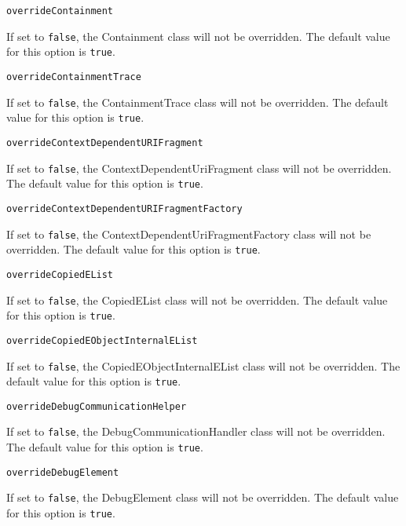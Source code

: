 \noindent\texttt{overrideContainment}
\begin{myindentpar}{1cm}
If set to \texttt{false}, the Containment class will not be overridden. The default value for this option is \texttt{true}.
\end{myindentpar}

\noindent\texttt{overrideContainmentTrace}
\begin{myindentpar}{1cm}
If set to \texttt{false}, the ContainmentTrace class will not be overridden. The default value for this option is \texttt{true}.
\end{myindentpar}

\noindent\texttt{overrideContextDependentURIFragment}
\begin{myindentpar}{1cm}
If set to \texttt{false}, the ContextDependentUriFragment class will not be overridden. The default value for this option is \texttt{true}.
\end{myindentpar}

\noindent\texttt{overrideContextDependentURIFragmentFactory}
\begin{myindentpar}{1cm}
If set to \texttt{false}, the ContextDependentUriFragmentFactory class will not be overridden. The default value for this option is \texttt{true}.
\end{myindentpar}

\noindent\texttt{overrideCopiedEList}
\begin{myindentpar}{1cm}
If set to \texttt{false}, the CopiedEList class will not be overridden. The default value for this option is \texttt{true}.
\end{myindentpar}

\noindent\texttt{overrideCopiedEObjectInternalEList}
\begin{myindentpar}{1cm}
If set to \texttt{false}, the CopiedEObjectInternalEList class will not be overridden. The default value for this option is \texttt{true}.
\end{myindentpar}

\noindent\texttt{overrideDebugCommunicationHelper}
\begin{myindentpar}{1cm}
If set to \texttt{false}, the DebugCommunicationHandler class will not be overridden. The default value for this option is \texttt{true}.
\end{myindentpar}

\noindent\texttt{overrideDebugElement}
\begin{myindentpar}{1cm}
If set to \texttt{false}, the DebugElement class will not be overridden. The default value for this option is \texttt{true}.
\end{myindentpar}

